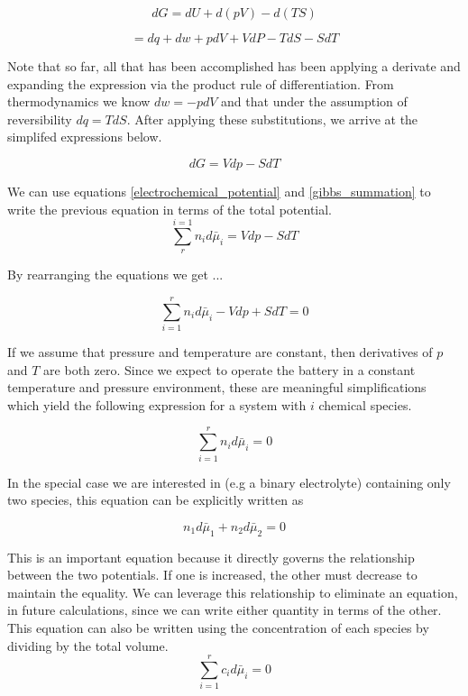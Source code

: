 \documentclass[lettersize,journal]{IEEEtran}
\begin{document}
\begin{equation}
    dG = dU + d(pV) - d(TS)
\end{equation}

\begin{equation}
  = dq + dw + pdV + VdP -TdS - SdT
\end{equation}

\noindent Note that so far, all that has been accomplished has been applying a derivate and expanding the expression via the product rule of differentiation. From thermodynamics we know $dw = -pdV$ and that under the assumption of reversibility $dq = TdS$. After applying these substitutions, we arrive at the simplifed expressions below.

\begin{equation}
  dG = Vdp - SdT
\end{equation}

We can use equations \ref{electrochemical_potential} and \ref{gibbs_summation} to write the previous equation in terms of the total potential.
\begin{equation}
  \sum_{r}^{i=1} n_id\bar{\mu}_i = Vdp - SdT
\end{equation}

\noindent By rearranging the equations we get ...

\begin{equation}
  \sum_{i=1}^{r} n_id\bar{\mu}_i - Vdp + SdT = 0
\end{equation}

\noindent If we assume that pressure and temperature are constant, then derivatives of $p$ and $T$ are both zero. Since we expect to operate the battery in a constant temperature and pressure environment, these are meaningful simplifications which yield the following expression for a system with $i$ chemical species.

\begin{equation}
  \sum_{i=1}^{r} n_id\bar{\mu}_i = 0
\end{equation}

In the special case we are interested in (e.g a binary electrolyte) containing only two species, this equation can be explicitly written as

\begin{equation}\label{gibbs_duhem_eqn}
  n_1 d\bar{\mu}_1 + n_2 d\bar{\mu}_2 = 0
\end{equation}

This is an important equation because it directly governs the relationship between the two potentials. If one is increased, the other must decrease to maintain the equality. We can leverage this relationship to eliminate an equation, in future calculations, since we can write either quantity in terms of the other. This equation can also be written using the concentration of each species by dividing by the total volume.
\begin{equation}
  \sum_{i=1}^{r} c_{i}d\bar{\mu}_i = 0
\end{equation}
\end{document}
